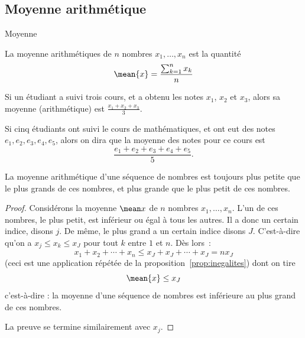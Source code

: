\subsection{Moyenne arithmétique}
\begin{frame}{Moyenne}
  \begin{definition}
    La moyenne arithmétiques de \(n\) nombres \(x_{1}, \ldots, x_{n}\) est la quantité
    \begin{equation*}
      \mean{x} = \frac{\sum_{k=1}^{n} x_{k}}{n}
    \end{equation*}
  \end{definition}
  \pause
  \begin{example}
    Si un étudiant a suivi trois cours, et a obtenu les notes \(x_{1}\), \(x_{2}\) et \(x_{3}\), alors sa moyenne (arithmétique) est \(\frac{x_{1} + x_{2} + x_{3}}{3}\).
  \end{example}
  \begin{example}
    Si cinq étudiants ont suivi le cours de mathématiques, et ont eut des notes \(e_{1}, e_{2}, e_{3}, e_{4}, e_{5}\), alors on dira que la moyenne des notes pour ce cours est
    \begin{equation*}
      \frac{e_{1} + e_{2} + e_{3} + e_{4} + e_{5}}{5}.
    \end{equation*}
  \end{example}
\end{frame}

\begin{frame}
  \begin{property}
    La moyenne arithmétique d'une séquence de nombres est toujours plus petite que le plus grands de ces nombres, et plus grande que le plus petit de ces nombres.
  \end{property}
  \begin{proof}
    Considérons la moyenne \(\mean x\) de \(n\) nombres \(x_{1}, \ldots, x_{n}\). L'un de ces nombres, \og le plus petit\fg{}, est inférieur ou égal à tous les autres. Il a donc un certain indice, disons \(j\). De même, le plus grand a un certain indice disons \(J\). C'est-à-dire qu'on a \(x_{j} \leq x_{k} \leq x_{J}\) pour tout \(k\) entre \(1\) et \(n\). Dès lors~:
    \begin{equation*}
      x_{1} + x_{2} + \cdots + x_{n} \leq x_{J} + x_{J} + \cdots + x_{J} = n x_{J}
    \end{equation*}
    (ceci est une application répétée de la proposition~\ref{prop:inegalites}) dont on tire
    \begin{equation*}
      \mean{x} \leq x_{J}
    \end{equation*}
    c'est-à-dire : la moyenne d'une séquence de nombres est inférieure au plus grand de ces nombres.

    La preuve se termine similairement avec \(x_{j}\).
  \end{proof}
\end{frame}
